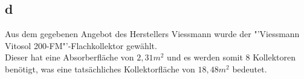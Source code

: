 \subsection{d}
Aus dem gegebenen Angebot des Herstellers Viessmann wurde der "'Viessmann Vitosol 200-FM"'-Flachkollektor gewählt.\\
Dieser hat eine Absorberfläche von $2,31 m^2$ und es werden somit 8 Kollektoren benötigt, was eine tatsächliches Kollektorfläche von $18,48 m^2$ bedeutet.\\
